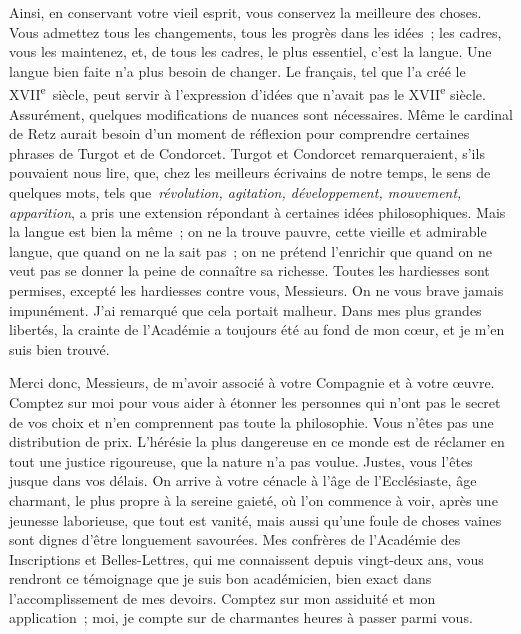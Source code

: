 \documentclass[french,twoside]{book} %
\newcommand\orgName[1]{#1}
\newcommand\persName[1]{#1}
\begin{document}
Ainsi, en conservant votre vieil esprit, vous conservez la meilleure des choses. Vous admettez tous les changements, tous les progrès dans les idées ; les cadres, vous les maintenez, et, de tous les cadres, le plus essentiel, c’est la langue. Une langue bien faite n’a plus besoin de changer. Le français, tel que l’a créé le XVII\textsuperscript{e} siècle, peut servir à l’expression d’idées que n’avait pas le XVII\textsuperscript{e} siècle. Assurément, quelques modifications de nuances sont nécessaires. Même le {\persName cardinal de Retz} aurait besoin d’un moment de réflexion pour comprendre certaines phrases de {\persName Turgot} et de {\persName Condorcet}. {\persName Turgot} et {\persName Condorcet} remarqueraient, s’ils pouvaient nous lire, que, chez les meilleurs écrivains de notre temps, le sens de quelques mots, tels que {\itshape révolution, agitation, développement, mouvement, apparition}, a pris une extension répondant à certaines idées philosophiques. Mais la langue est bien la même ; on ne la trouve pauvre, cette vieille et admirable langue, que quand on ne la sait pas ; on ne prétend l’enrichir que quand on ne veut pas se donner la peine de connaître sa richesse. Toutes les hardiesses sont permises, excepté les hardiesses contre vous, Messieurs. On ne vous brave jamais impunément. J’ai remarqué que cela portait malheur. Dans mes plus grandes libertés, la crainte de l’{\orgName Académie} a toujours été au fond de mon cœur, et je m’en suis bien trouvé.\par
Merci donc, Messieurs, de m’avoir associé à votre {\orgName Compagnie} et à votre œuvre. Comptez sur moi pour vous aider à étonner les personnes qui n’ont pas le secret de vos choix et n’en comprennent pas toute la philosophie. Vous n’êtes pas une distribution de prix. L’hérésie la plus dangereuse en ce monde est de réclamer en tout une justice rigoureuse, que la nature n’a pas voulue. Justes, vous l’êtes jusque dans vos délais. On arrive à votre cénacle à l’âge de l’Ecclésiaste, âge charmant, le plus propre à la sereine gaieté, où l’on commence à voir, après une jeunesse laborieuse, que tout est vanité, mais aussi qu’une foule de choses vaines sont dignes d’être longuement savourées. Mes confrères de l’{\orgName Académie des Inscriptions et Belles-Lettres}, qui me connaissent depuis vingt-deux ans, vous rendront ce témoignage que je suis bon académicien, bien exact dans l’accomplissement de mes devoirs. Comptez sur mon assiduité et mon application ; moi, je compte sur de charmantes heures à passer parmi vous.\par
\end{document}
